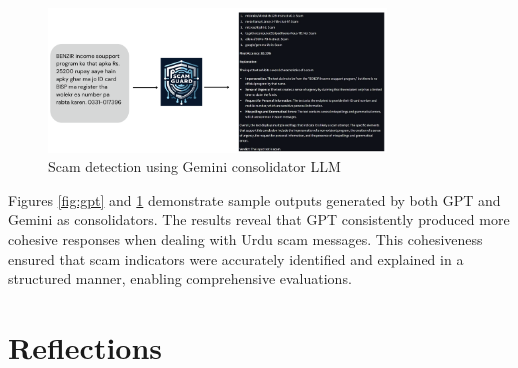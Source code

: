 \documentclass[11pt]{article}
\begin{document}
\begin{figure}[ht]
    \centering
    \includegraphics[width=0.8\textwidth]{gemini.png} 
    \caption{Scam detection using Gemini consolidator LLM}
    \label{fig:gemini}
\end{figure}

Figures \ref{fig:gpt} and \ref{fig:gemini}  demonstrate sample outputs generated by both GPT and Gemini as consolidators. The results reveal that GPT consistently produced more cohesive responses when dealing with Urdu scam messages. This cohesiveness ensured that scam indicators were accurately identified and explained in a structured manner, enabling comprehensive evaluations.

\section{Reflections}
\end{document}
